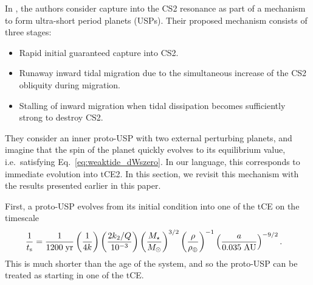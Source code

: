 \documentclass[
        fleqn,
        usenatbib,
        referee,
    ]{mnras}
\newcommand*{\p}[1]{\left(#1\right)}
\begin{document}
In \citet{millholland2020formation}, the authors consider capture into the CS2
resonance as part of a mechanism to form ultra-short period planets (USPs).
Their proposed mechanism consists of three stages:
\begin{itemize}
    \item Rapid initial guaranteed capture into CS2.

    \item Runaway inward tidal migration due to the simultaneous increase of the
        CS2 obliquity during migration.

    \item Stalling of inward migration when tidal dissipation becomes
        sufficiently strong to destroy CS2.
\end{itemize}
They consider an inner proto-USP with two external perturbing planets, and
imagine that the spin of the planet quickly evolves to its equilibrium value,
i.e.\ satisfying Eq.~\eqref{eq:weaktide_dWszero}. In our language, this
corresponds to immediate evolution into tCE2. In this section, we revisit this
mechanism with the results presented earlier in this paper.

First, a proto-USP evolves from its initial condition into one of the tCE on the
timescale
\begin{align}
    \frac{1}{t_{\rm s}} ={}& \frac{1}{1200\;\mathrm{yr}}
            \p{\frac{1}{4k}}
            \p{\frac{2k_2/Q}{10^{-3}}}
            \p{\frac{M_\star}{M_{\odot}}}^{3/2}
            \p{\frac{\rho}{\rho_{\oplus}}}^{-1}
            \p{\frac{a}{0.035\;\mathrm{AU}}}^{-9/2}.
\end{align}
This is much shorter than the age of the system, and so the proto-USP can be
treated as starting in one of the tCE\@.
\end{document}
